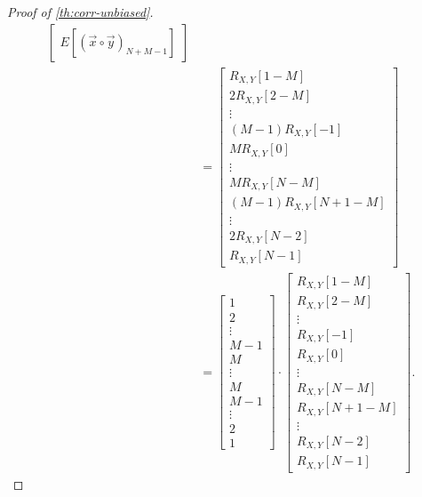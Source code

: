 \documentclass[a4paper, openany, oneside]{memoir}
\begin{document}
\begin{proof}[Proof of \cref{th:corr-unbiased}]
\begin{align*}
\begin{bmatrix}
            E[(\vec{x} \circ \vec{y})_{N+M-1}]
        \end{bmatrix} \\
        &= \begin{bmatrix}
            R_{X,Y}[1-M] \\
            2 R_{X,Y}[2-M] \\
            \vdots \\
            (M-1) R_{X,Y}[-1] \\
            M R_{X,Y}[0] \\
            \vdots \\
            M R_{X,Y}[N-M] \\
            (M-1) R_{X,Y}[N+1-M] \\
            \vdots \\
            2 R_{X,Y}[N-2] \\
            R_{X,Y}[N-1]
        \end{bmatrix} \\
        &= \begin{bmatrix}
            1 \\
            2 \\
            \vdots \\
            M-1 \\
            M \\
            \vdots \\
            M \\
            M-1 \\
            \vdots \\
            2 \\
            1
        \end{bmatrix} \cdot \begin{bmatrix}
            R_{X,Y}[1-M] \\
            R_{X,Y}[2-M] \\
            \vdots \\
            R_{X,Y}[-1] \\
            R_{X,Y}[0] \\
            \vdots \\
            R_{X,Y}[N-M] \\
            R_{X,Y}[N+1-M] \\
            \vdots \\
            R_{X,Y}[N-2] \\
            R_{X,Y}[N-1]
        \end{bmatrix}.
    \end{align*}
\end{proof}
\end{document}

